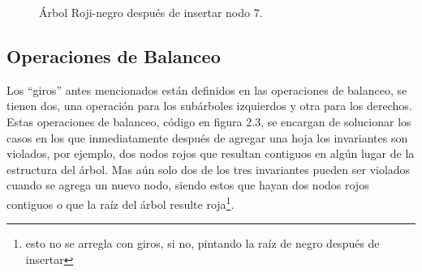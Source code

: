 \documentclass[8pt,leqno,pdflatex,spanish]{book}
\newcommand{\Arn}{Árbol Roji-negro}
\theoremstyle{plain}
\theoremstyle{definition}
\theoremstyle{remark}
\begin{document}
\begin{figure}
\centering 
\captionsetup{justification=centering}
\label{arbolRB}
\caption{{\Arn} después de insertar nodo 7.}
\end{figure}
\subsection{Operaciones de Balanceo}
Los ``giros'' antes mencionados están definidos en las operaciones de balanceo, se tienen dos, una 
operaci\'on para los subárboles izquierdos y otra para los derechos. Estas operaciones de 
balanceo, c\'odigo en figura 2.3, se encargan de solucionar los casos en los que inmediatamente 
después de agregar una hoja los invariantes son violados, por ejemplo, dos nodos rojos que 
resultan contiguos en algún lugar de la estructura del \'arbol. Mas a\'un solo dos de los tres 
invariantes pueden ser violados cuando se agrega un nuevo nodo, siendo estos que hayan dos nodos 
rojos contiguos o que la raíz del árbol resulte roja\footnote{esto no se arregla con giros, si no, 
pintando la raíz de negro después de insertar}.
\end{document}
